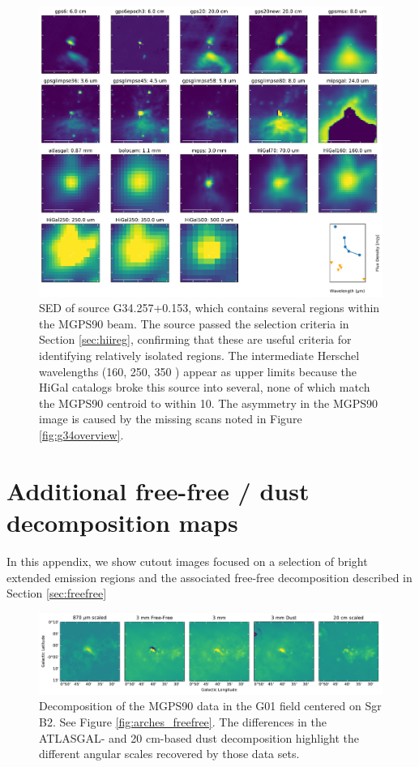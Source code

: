 \documentclass[twocolumn]{aastex62}
\newcommand{\MGPS}{MGPS90\xspace}
\begin{document}
\begin{figure}[htp]
\includegraphics[width=17cm]{figures/SED_plot_G34_G34.257+0.153.pdf}
\caption{SED of source G34.257+0.153, which contains several \hchii regions
within the MGPS90 beam.  The source passed the selection criteria in Section
\ref{sec:hiireg}, confirming that these are useful criteria for identifying
relatively isolated \hchii regions. The intermediate Herschel wavelengths (160,
250, 350 \um) appear as upper limits because the HiGal catalogs broke this
source into several, none of which match the MGPS90 centroid to within
10\arcsec.  The asymmetry in the \MGPS image is caused by the missing
scans noted in Figure \ref{fig:g34overview}.}
\label{fig:g34hchii}
\end{figure}



\appendix

\section{Additional free-free / dust decomposition maps}
In this appendix, we show cutout images focused on a selection of bright extended emission regions
and the associated free-free decomposition described in Section \ref{sec:freefree}

\begin{figure}[htp]
    \includegraphics[width=17cm]{figures/G01_sgrb2_5panel.pdf}
    \caption{Decomposition of the MGPS90 data in the G01 field centered on Sgr B2.
    See Figure \ref{fig:arches_freefree}.
    The differences in the ATLASGAL- and 20 cm-based dust decomposition highlight the
    different angular scales recovered by those data sets.
}
\label{fig:sgrb2freefree}
\end{figure}
\end{document}
